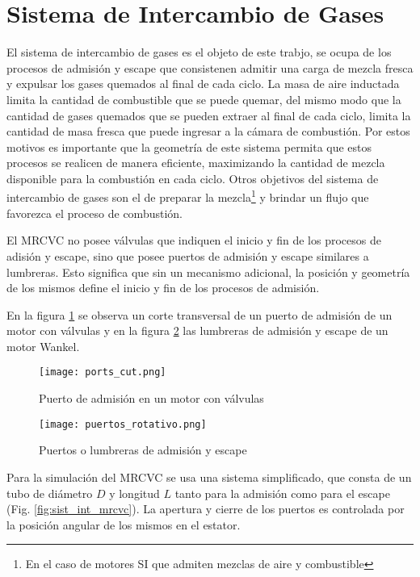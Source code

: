 \section{Sistema de Intercambio de Gases}
%
El sistema de intercambio de gases es el objeto de este trabjo, se ocupa de los
procesos de admisión y escape que consistenen admitir una carga de mezcla
fresca y expulsar los gases quemados al final de cada ciclo.
%
La masa de aire inductada limita la cantidad de combustible que se puede
quemar, del mismo modo que la cantidad de gases quemados que se pueden extraer
al final de cada ciclo, limita la cantidad de masa fresca que puede ingresar a
la cámara de combustión.
%
Por estos motivos es importante que la geometría de este sistema permita que
estos procesos se realicen de manera eficiente, maximizando la cantidad de mezcla
disponible para la combustión en cada ciclo.
%
Otros objetivos del sistema de intercambio de gases son el de preparar la
mezcla\footnote{En el caso de motores SI que admiten mezclas de aire y
combustible} y brindar un flujo que favorezca el proceso de combustión.



El MRCVC no posee válvulas que indiquen el inicio y fin de los procesos
de adisión y escape, sino que posee puertos de admisión y escape similares a
lumbreras.
%
Esto significa que sin un mecanismo adicional, la posición y geometría de los
mismos define el inicio y fin de los procesos de admisión.

En la figura \ref{fig:valvulas} se observa un corte transversal de un puerto de
admisión de un motor con válvulas y en la figura \ref{fig:puertos} las
lumbreras de admisión y escape de un motor Wankel.

\begin{figure} \centering
    \texttt{[image: ports\_cut.png]}
    \caption{Puerto de admisión en un motor con válvulas} 
    \label{fig:valvulas}
\end{figure}

\begin{figure} \centering
    \texttt{[image: puertos\_rotativo.png]}
    \caption{Puertos o lumbreras de admisión y escape} 
    \label{fig:puertos}
\end{figure}

Para la simulación del MRCVC se usa una sistema simplificado, que consta de un
tubo de diámetro $D$ y longitud $L$ tanto para la admisión como para el escape
(Fig. \ref{fig:sist_int_mrcvc}).
%
La apertura y cierre de los puertos es controlada por la posición angular de
los mismos en el estator.

